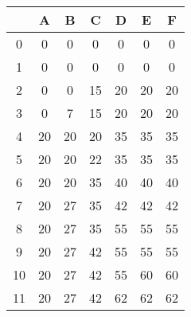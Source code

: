 \documentclass[a4paper]{article}
\begin{document}
\begin{table}[H]
\centering
\relax
\begin{tabular}{|c|c|c|c|c|c|c|}
\hline
 & A & B & C & D & E & F \\
\hline
0 & 0 \cellcolor{red!50} & 0 \cellcolor{red!50} & 0 \cellcolor{red!50} & 0 \cellcolor{red!50} & 0 \cellcolor{red!50} & 0 \cellcolor{red!50} \\
\hline
1 & 0 \cellcolor{red!50} & 0 \cellcolor{red!50} & 0 \cellcolor{red!50} & 0 \cellcolor{red!50} & 0 \cellcolor{red!50} & 0 \cellcolor{red!50} \\
\hline
2 & 0 \cellcolor{red!50} & 0 \cellcolor{red!50} & 15 \cellcolor{green!50} & 20 \cellcolor{green!50} & 20 \cellcolor{red!50} & 20 \cellcolor{red!50} \\
\hline
3 & 0 \cellcolor{red!50} & 7 \cellcolor{green!50} & 15 \cellcolor{green!50} & 20 \cellcolor{green!50} & 20 \cellcolor{red!50} & 20 \cellcolor{red!50} \\
\hline
4 & 20 \cellcolor{green!50} & 20 \cellcolor{red!50} & 20 \cellcolor{red!50} & 35 \cellcolor{green!50} & 35 \cellcolor{red!50} & 35 \cellcolor{red!50} \\
\hline
5 & 20 \cellcolor{green!50} & 20 \cellcolor{red!50} & 22 \cellcolor{green!50} & 35 \cellcolor{green!50} & 35 \cellcolor{red!50} & 35 \cellcolor{red!50} \\
\hline
6 & 20 \cellcolor{green!50} & 20 \cellcolor{red!50} & 35 \cellcolor{green!50} & 40 \cellcolor{green!50} & 40 \cellcolor{red!50} & 40 \cellcolor{red!50} \\
\hline
7 & 20 \cellcolor{green!50} & 27 \cellcolor{green!50} & 35 \cellcolor{green!50} & 42 \cellcolor{green!50} & 42 \cellcolor{red!50} & 42 \cellcolor{red!50} \\
\hline
8 & 20 \cellcolor{green!50} & 27 \cellcolor{green!50} & 35 \cellcolor{green!50} & 55 \cellcolor{green!50} & 55 \cellcolor{red!50} & 55 \cellcolor{red!50} \\
\hline
9 & 20 \cellcolor{green!50} & 27 \cellcolor{green!50} & 42 \cellcolor{green!50} & 55 \cellcolor{green!50} & 55 \cellcolor{red!50} & 55 \cellcolor{red!50} \\
\hline
10 & 20 \cellcolor{green!50} & 27 \cellcolor{green!50} & 42 \cellcolor{green!50} & 55 \cellcolor{green!50} & 60 \cellcolor{green!50} & 60 \cellcolor{red!50} \\
\hline
11 & 20 \cellcolor{green!50} & 27 \cellcolor{green!50} & 42 \cellcolor{green!50} & 62 \cellcolor{green!50} & 62 \cellcolor{red!50} & 62 \cellcolor{red!50} \\

\end{tabular}
\end{table}
\end{document}
